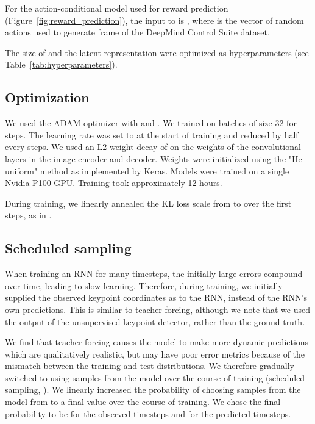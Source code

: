 For the action-conditional model used for reward prediction (Figure~\ref{fig:reward_prediction}), the input to  is , where  is the vector of random actions used to generate frame  of the DeepMind Control Suite dataset.

The size of  and the latent representation  were optimized as hyperparameters (see Table~\ref{tab:hyperparameters}).

\subsection{Optimization}

We used the ADAM optimizer \cite{kingma_adam_2014} with  and . We trained on batches of size 32 for  steps. The learning rate was set to  at the start of training and reduced by half every  steps. We used an L2 weight decay of  on the weights of the convolutional layers in the image encoder and decoder. Weights were initialized using the "He uniform" method as implemented by Keras. Models were trained on a single Nvidia P100 GPU. Training took approximately 12 hours.

During training, we linearly annealed the KL loss scale from  to  over the first  steps, as in \cite{bowman_generating_2016}.

\subsection{Scheduled sampling}

When training an RNN for many timesteps, the initially large errors compound over time, leading to slow learning. Therefore, during training, we initially supplied the observed keypoint coordinates as  to the RNN, instead of the RNN's own predictions. This is similar to teacher forcing, although we note that we used the output of the unsupervised keypoint detector, rather than the ground truth. 

We find that teacher forcing causes the model to make more dynamic predictions which are qualitatively realistic, but may have poor error metrics because of the mismatch between the training and test distributions. We therefore gradually switched to using samples from the model over the course of training (scheduled sampling, \cite{bengio_scheduled_2015}). We linearly increased the probability of choosing samples from the model from  to a final value over the course of training. We chose the final probability to be  for the observed timesteps and  for the predicted timesteps. 

